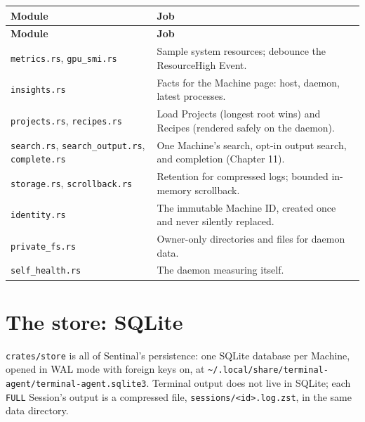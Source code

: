 \begin{small}
\begin{longtable}{>{\raggedright\arraybackslash}p{0.396\dimexpr \linewidth-4\tabcolsep\relax}>{\raggedright\arraybackslash}p{0.604\dimexpr \linewidth-4\tabcolsep\relax}}
\toprule
\textbf{Module} & \textbf{Job} \\
\midrule
\endfirsthead
\toprule
\textbf{Module} & \textbf{Job} \\
\midrule
\endhead
\texttt{metrics.\allowbreak{}rs}, \texttt{gpu\_\allowbreak{}smi.\allowbreak{}rs} & Sample system resources; debounce the ResourceHigh Event. \\
\texttt{insights.\allowbreak{}rs} & Facts for the Machine page: host, daemon, latest processes. \\
\texttt{projects.\allowbreak{}rs}, \texttt{recipes.\allowbreak{}rs} & Load Projects (longest root wins) and Recipes (rendered safely on the daemon). \\
\texttt{search.\allowbreak{}rs}, \texttt{search\_\allowbreak{}output.\allowbreak{}rs}, \texttt{complete.\allowbreak{}rs} & One Machine's search, opt-in output search, and completion (Chapter 11). \\
\texttt{storage.\allowbreak{}rs}, \texttt{scrollback.\allowbreak{}rs} & Retention for compressed logs; bounded in-memory scrollback. \\
\texttt{identity.\allowbreak{}rs} & The immutable Machine ID, created once and never silently replaced. \\
\texttt{private\_\allowbreak{}fs.\allowbreak{}rs} & Owner-only directories and files for daemon data. \\
\texttt{self\_\allowbreak{}health.\allowbreak{}rs} & The daemon measuring itself. \\
\bottomrule
\end{longtable}
\end{small}

\chapter{\texorpdfstring{The store: SQLite}{The store: SQLite}}

\texttt{crates/\allowbreak{}store} is all of Sentinal's persistence: one SQLite database per Machine, opened in WAL mode with foreign keys on, at \texttt{\textasciitilde{}/\allowbreak{}.\allowbreak{}local/\allowbreak{}share/\allowbreak{}terminal-{}\allowbreak{}agent/\allowbreak{}terminal-{}\allowbreak{}agent.\allowbreak{}sqlite3}. Terminal output does not live in SQLite; each \texttt{FULL} Session's output is a compressed file, \texttt{sessions/\allowbreak{}\textless{}id\textgreater{}.\allowbreak{}log.\allowbreak{}zst}, in the same data directory.

